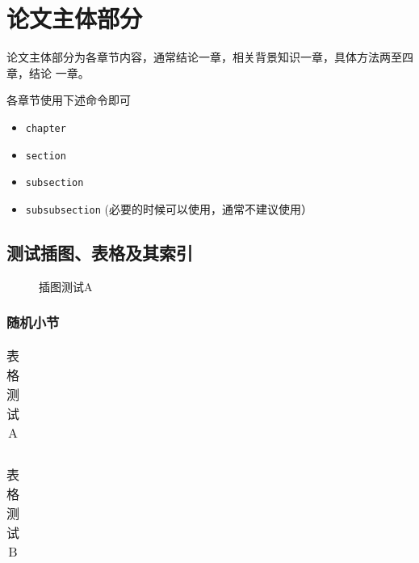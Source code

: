 
\chapter{论文主体部分}
\label{cha:mainmatter}

论文主体部分为各章节内容，通常结论一章，相关背景知识一章，具体方法两至四章，结论
一章。

各章节使用下述命令即可
\begin{itemize}
\item \texttt{chapter}
\item \texttt{section}
\item \texttt{subsection}
\item \texttt{subsubsection} (必要的时候可以使用，通常不建议使用）
\end{itemize}


\section{测试插图、表格及其索引}
\label{sec:testing}

\begin{figure}
  \centering
  
  \caption{插图测试A}
  \label{fig:test:a}
\end{figure}

\subsection{随机小节}
\label{sec:random-tf}

\begin{table}
  \centering
  \begin{tabular}{ccccc}
    \hline
  \end{tabular}
  \caption{表格测试A}
  \label{tab:test}
\end{table}


\begin{table}
  \centering
  \begin{tabular}{ccccc}
    \hline
  \end{tabular}
  \caption{表格测试B}
  \label{tab:test:b}
\end{table}


